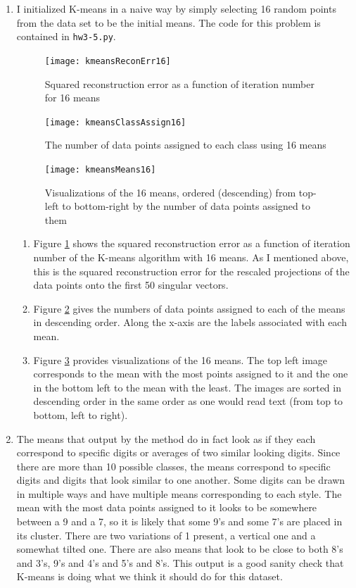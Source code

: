 \documentclass{article}
\begin{document}
\begin{enumerate}
	\item I initialized K-means in a naive way by simply selecting 16 random points from the data set to be the initial means. The code for this problem is contained in \texttt{hw3-5.py}.
	\begin{figure}
		\centering
	    	\texttt{[image: kmeansReconErr16]}
	    	\caption{Squared reconstruction error as a function of iteration number for 16 means}
	    	\label{fig:kmErr16}
	\end{figure}
	\begin{figure}
		\centering
	    	\texttt{[image: kmeansClassAssign16]}
	    	\caption{The number of data points assigned to each class using 16 means}
	    	\label{fig:kmAs16}
	\end{figure}
	\begin{figure}
		\centering
		\texttt{[image: kmeansMeans16]}
		\caption{Visualizations of the 16 means, ordered (descending) from top-left to bottom-right by the number of data points assigned to them}
		\label{fig:kmVis16}
	\end{figure}

	\begin{enumerate}
		\item Figure \ref{fig:kmErr16} shows the squared reconstruction error as a function of iteration number of the K-means algorithm with 16 means. As I mentioned above, this is the squared reconstruction error for the rescaled projections of the data points onto the first 50 singular vectors.
		\item Figure \ref{fig:kmAs16} gives the numbers of data points assigned to each of the means in descending order. Along the x-axis are the labels associated with each mean.
		\item Figure \ref{fig:kmVis16} provides visualizations of the 16 means. The top left image corresponds to the mean with the most points assigned to it and the one in the bottom left to the mean with the least. The images are sorted in descending order in the same order as one would read text (from top to bottom, left to right).
	\end{enumerate}

	\item The means that output by the method do in fact look as if they each correspond to specific digits or averages of two similar looking digits. Since there are more than 10 possible classes, the means correspond to specific digits and digits that look similar to one another. Some digits can be drawn in multiple ways and have multiple means corresponding to each style. The mean with the most data points assigned to it looks to be somewhere between a 9 and a 7, so it is likely that some 9's and some 7's are placed in its cluster. There are two variations of 1 present, a vertical one and a somewhat tilted one. There are also means that look to be close to both 8's and 3's, 9's and 4's and 5's and 8's. This output is a good sanity check that K-means is doing what we think it should do for this dataset.


\end{enumerate}
\end{document}

